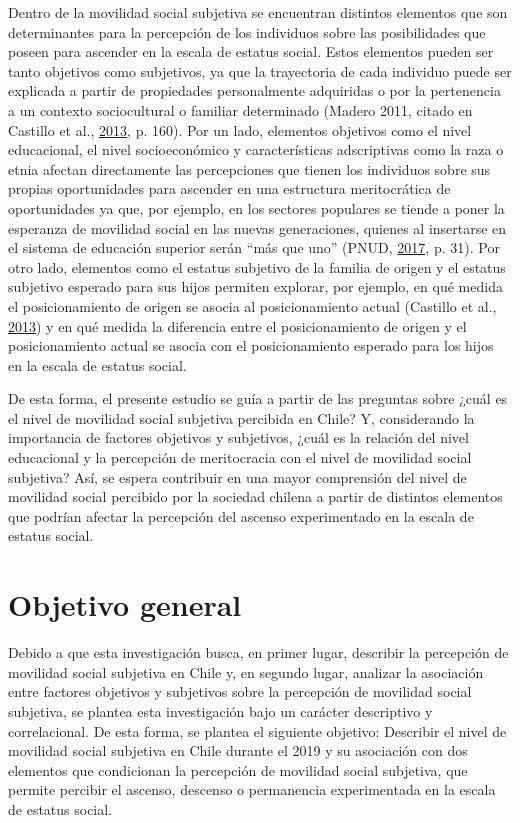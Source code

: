 \documentclass[
]{article}
\begin{document}
Dentro de la movilidad social subjetiva se encuentran distintos
elementos que son determinantes para la percepción de los individuos
sobre las posibilidades que poseen para ascender en la escala de estatus
social. Estos elementos pueden ser tanto objetivos como subjetivos, ya
que la trayectoria de cada individuo puede ser explicada a partir de
propiedades personalmente adquiridas o por la pertenencia a un contexto
sociocultural o familiar determinado (Madero 2011, citado en Castillo et
al., \protect\hyperlink{ref-castillo_Todos_2013}{2013}, p. 160). Por un
lado, elementos objetivos como el nivel educacional, el nivel
socioeconómico y características adscriptivas como la raza o etnia
afectan directamente las percepciones que tienen los individuos sobre
sus propias oportunidades para ascender en una estructura meritocrática
de oportunidades ya que, por ejemplo, en los sectores populares se
tiende a poner la esperanza de movilidad social en las nuevas
generaciones, quienes al insertarse en el sistema de educación superior
serán ``más que uno'' (PNUD,
\protect\hyperlink{ref-pnud_Desiguales_2017}{2017}, p. 31). Por otro
lado, elementos como el estatus subjetivo de la familia de origen y el
estatus subjetivo esperado para sus hijos permiten explorar, por
ejemplo, en qué medida el posicionamiento de origen se asocia al
posicionamiento actual (Castillo et al.,
\protect\hyperlink{ref-castillo_Todos_2013}{2013}) y en qué medida la
diferencia entre el posicionamiento de origen y el posicionamiento
actual se asocia con el posicionamiento esperado para los hijos en la
escala de estatus social.

De esta forma, el presente estudio se guía a partir de las preguntas
sobre ¿cuál es el nivel de movilidad social subjetiva percibida en
Chile? Y, considerando la importancia de factores objetivos y
subjetivos, ¿cuál es la relación del nivel educacional y la percepción
de meritocracia con el nivel de movilidad social subjetiva? Así, se
espera contribuir en una mayor comprensión del nivel de movilidad social
percibido por la sociedad chilena a partir de distintos elementos que
podrían afectar la percepción del ascenso experimentado en la escala de
estatus social.

\hypertarget{objetivo-general}{%
\section{Objetivo general}\label{objetivo-general}}

Debido a que esta investigación busca, en primer lugar, describir la
percepción de movilidad social subjetiva en Chile y, en segundo lugar,
analizar la asociación entre factores objetivos y subjetivos sobre la
percepción de movilidad social subjetiva, se plantea esta investigación
bajo un carácter descriptivo y correlacional. De esta forma, se plantea
el siguiente objetivo: Describir el nivel de movilidad social subjetiva
en Chile durante el 2019 y su asociación con dos elementos que
condicionan la percepción de movilidad social subjetiva, que permite
percibir el ascenso, descenso o permanencia experimentada en la escala
de estatus social.
\end{document}

